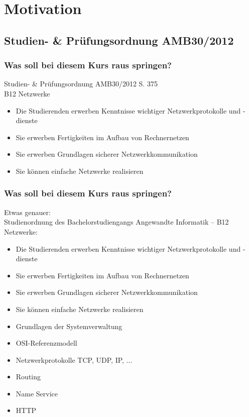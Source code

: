 \documentclass[xcolor=dvipsnames,aspectratio=169]{beamer}
\begin{document}
\section{Motivation}
\subsection{Studien- \& Prüfungsordnung AMB30/2012}
\begin{frame}
	\frametitle{Was soll bei diesem Kurs raus springen?}
	Studien- \& Prüfungsordnung AMB30/2012 S. 375\\
	B12 Netzwerke
	\begin{itemize}
		\item Die Studierenden erwerben Kenntnisse wichtiger Netzwerkprotokolle und -dienste
		\item Sie erwerben Fertigkeiten im Aufbau von Rechnernetzen
		\item Sie erwerben Grundlagen sicherer Netzwerkkommunikation
		\item Sie können einfache Netzwerke realisieren
	\end{itemize}
\end{frame}

\begin{frame}
	\frametitle{Was soll bei diesem Kurs raus springen?}
	\vspace{-0.7cm}
	Etwas genauer:\\
	Studienordnung des Bachelorstudiengangs Angewandte Informatik -- B12 Netzwerke:
	\begin{itemize}
		\item Die Studierenden erwerben Kenntnisse wichtiger Netzwerkprotokolle und -dienste
		\item Sie erwerben Fertigkeiten im Aufbau von Rechnernetzen
		\item Sie erwerben Grundlagen sicherer Netzwerkkommunikation
		\item Sie können einfache Netzwerke realisieren
		\item Grundlagen der Systemverwaltung
		\item OSI-Referenzmodell
		\item Netzwerkprotokolle TCP, UDP, IP, ...
		\item Routing
		\item Name Service
		\item HTTP
	\end{itemize}
\end{frame}
\end{document}
